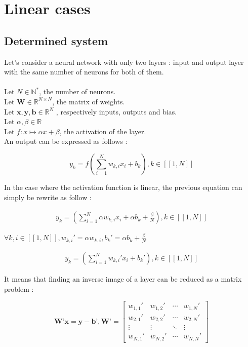 \documentclass{article}
\begin{document}
\section{Linear cases}

\subsection{Determined system}
Let’s consider a neural network with only two layers : input and output layer with the same number of neurons for both of them.\\
\\
Let $ N \in \mathbb{N^{*}}$, the number of neurons.\\
Let $\textbf{W}\in \mathbb{R}^{N \times N}$, the matrix of weights.\\
Let $\textbf{x},\textbf{y},\textbf{b} \in \mathbb{R}^{N}$ , respectively inputs, outputs and bias.\\
Let $\alpha,\beta \in \mathbb{R}$\\
Let $f:x \mapsto \alpha x + \beta $, the activation of the layer.\\
An output can be expressed as follows : 

\[y_{k} = f(\sum_{i=1}^{N} w_{k,i}x_{i} + b_{k}) ,  k \in [\![1,N]\!] \]

In the case where the activation function is linear, the previous equation can simply be rewrite as follow :

\begin{align}
    y_{k} = (\sum_{i=1}^{N} \alpha w_{k,i}x_{i} + \alpha b_{k} + \frac{\beta}{N} ),  k \in [\![1,N]\!] 
\end{align}

$\forall k,i \in [\![1,N]\!],w_{k,i}'=\alpha w_{k,i},b_{k}'=\alpha b_{k} + \frac{\beta}{N} $

\begin{align*}
    y_{k} = (\sum_{i=1}^{N}  w_{k,i}'x_{i} +  b_{k}' ),  k \in [\![1,N]\!] 
\end{align*}

It means that finding an inverse image of a layer can be reduced as a matrix problem : 

\begin{equation}
    \textbf{W'}\textbf{x}=\textbf{y}-\textbf{b'},\textbf{W'}= 
    \begin{bmatrix}
    w_{1,1}' & w_{1,2}' & \cdots & w_{1,N}' \\
    w_{2,1}' & w_{2,2}' & \cdots & w_{2,N}' \\
    \vdots  & \vdots  & \ddots & \vdots  \\
    w_{N,1}' & w_{N,2}' & \cdots & w_{N,N}' 
    \end{bmatrix}
    \end{equation}
\end{document}
